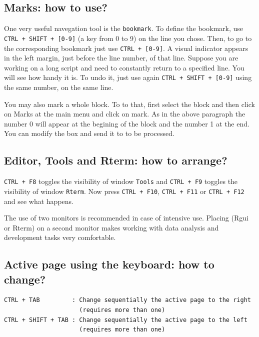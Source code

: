 \subsection{Marks: how to use?}

One very useful navegation tool is the \texttt{bookmark}. To define the bookmark,
use \texttt{CTRL + SHIFT + [0-9]} (a key from 0 to 9) on the line you chose.
Then, to go to the corresponding bookmark just use \texttt{CTRL + [0-9]}.
A visual indicator appears in the left margin, just before the line number, of that line.
Suppose you are working on a long script and need to constantly return to a specified line.
You will see how handy it is. To undo it, just use again \texttt{CTRL + SHIFT + [0-9]} using the same number, on the same line.

You may also mark a whole block. To to that, first select the block and then click on Marks at the main menu and click on mark.
As in the above paragraph the number 0 will appear at the begining of the block and the number 1 at the end.
You can modify the box and send it to \RR{} to be processed.

\subsection{Editor, Tools and Rterm: how to arrange?}

\texttt{CTRL + F8} toggles the visibility of window \texttt{Tools} and \texttt{CTRL + F9}
toggles the visibility of window \texttt{Rterm}. Now press \texttt{CTRL + F10},
\texttt{CTRL + F11} or \texttt{CTRL + F12} and see what happens.

The use of two monitors is recommended in case of intensive use.
Placing \RR{} (Rgui or Rterm) on a second monitor makes working with data analysis and development tasks very comfortable.

\subsection{Active page using the keyboard: how to change?}

\begin{verbatim}
CTRL + TAB         : Change sequentially the active page to the right
                     (requires more than one)
CTRL + SHIFT + TAB : Change sequentially the active page to the left
                     (requires more than one)
\end{verbatim}

